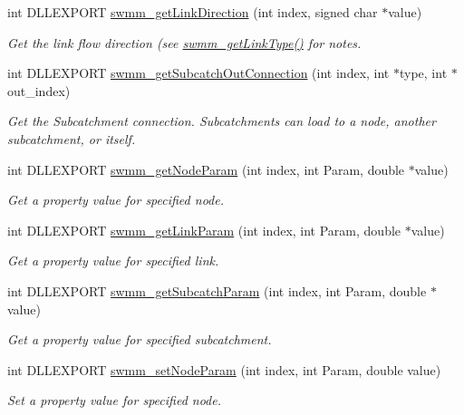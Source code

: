 \begin{DoxyCompactItemize}
int D\+L\+L\+E\+X\+P\+O\+RT \hyperlink{group___network_info_gac390c83be7f7f0e2cd9c6f1126a226aa}{swmm\+\_\+get\+Link\+Direction} (int index, signed char $\ast$value)
\begin{DoxyCompactList}\small\item\em Get the link flow direction (see \hyperlink{group___network_info_gacf4d0ca8a3ced3c1b8797f3f09fff1d0}{swmm\+\_\+get\+Link\+Type()} for notes. \end{DoxyCompactList}\item 
int D\+L\+L\+E\+X\+P\+O\+RT \hyperlink{group___network_info_ga5bf84d942a741d62d12b87dbdb2c49b4}{swmm\+\_\+get\+Subcatch\+Out\+Connection} (int index, int $\ast$type, int $\ast$out\+\_\+index)
\begin{DoxyCompactList}\small\item\em Get the Subcatchment connection. Subcatchments can load to a node, another subcatchment, or itself. \end{DoxyCompactList}\item 
int D\+L\+L\+E\+X\+P\+O\+RT \hyperlink{group___network_info_ga90d0d4c48e2cbeaea1bd43ba095a6672}{swmm\+\_\+get\+Node\+Param} (int index, int Param, double $\ast$value)
\begin{DoxyCompactList}\small\item\em Get a property value for specified node. \end{DoxyCompactList}\item 
int D\+L\+L\+E\+X\+P\+O\+RT \hyperlink{group___network_info_gaab21d9f5a8789ab41c981a90e1240cc5}{swmm\+\_\+get\+Link\+Param} (int index, int Param, double $\ast$value)
\begin{DoxyCompactList}\small\item\em Get a property value for specified link. \end{DoxyCompactList}\item 
int D\+L\+L\+E\+X\+P\+O\+RT \hyperlink{group___network_info_ga20fcc911e1b6dbf4393a8e404d840963}{swmm\+\_\+get\+Subcatch\+Param} (int index, int Param, double $\ast$value)
\begin{DoxyCompactList}\small\item\em Get a property value for specified subcatchment. \end{DoxyCompactList}\item 
int D\+L\+L\+E\+X\+P\+O\+RT \hyperlink{group___network_info_gaa0bc371349ae8f593722e0c3bb0abf31}{swmm\+\_\+set\+Node\+Param} (int index, int Param, double value)
\begin{DoxyCompactList}\small\item\em Set a property value for specified node. \end{DoxyCompactList}\item 

\end{DoxyCompactItemize}
